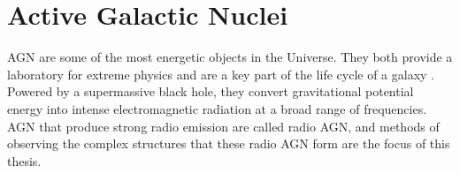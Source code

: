 

\section{Active Galactic Nuclei}
\label{sec:agn}

    AGN are some of the most energetic objects in the Universe. They both provide a laboratory for extreme physics and are a key part of the life cycle of a galaxy \citep{heckman_coevolution_2014}. Powered by a supermassive black hole, they convert gravitational potential energy into intense electromagnetic radiation at a broad range of frequencies. AGN that produce strong radio emission are called radio AGN, and methods of observing the complex structures that these radio AGN form are the focus of this thesis.

